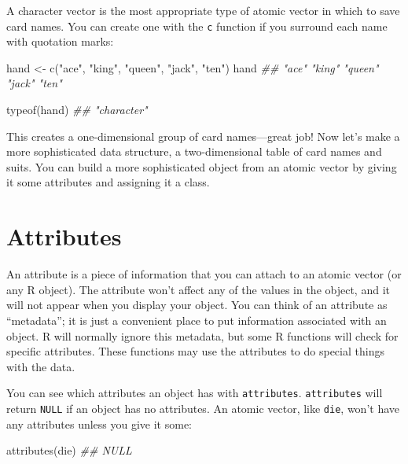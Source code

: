 \documentclass[
  letterpaper,
  DIV=11,
  numbers=noendperiod]{scrbook}
\newenvironment{Shaded}{\begin{snugshade}}{\end{snugshade}}
\newcommand{\DocumentationTok}[1]{\textcolor[rgb]{0.37,0.37,0.37}{\textit{#1}}}
\newcommand{\FunctionTok}[1]{\textcolor[rgb]{0.28,0.35,0.67}{#1}}
\newcommand{\NormalTok}[1]{\textcolor[rgb]{0.00,0.23,0.31}{#1}}
\newcommand{\OtherTok}[1]{\textcolor[rgb]{0.00,0.23,0.31}{#1}}
\newcommand{\StringTok}[1]{\textcolor[rgb]{0.13,0.47,0.30}{#1}}
\begin{document}
A character vector is the most appropriate type of atomic vector in
which to save card names. You can create one with the \texttt{c}
function if you surround each name with quotation marks:

\begin{Shaded}
\begin{Highlighting}[]
\NormalTok{hand }\OtherTok{\textless{}{-}} \FunctionTok{c}\NormalTok{(}\StringTok{"ace"}\NormalTok{, }\StringTok{"king"}\NormalTok{, }\StringTok{"queen"}\NormalTok{, }\StringTok{"jack"}\NormalTok{, }\StringTok{"ten"}\NormalTok{)}
\NormalTok{hand}
\DocumentationTok{\#\# "ace"   "king"  "queen" "jack"  "ten"  }

\FunctionTok{typeof}\NormalTok{(hand)}
\DocumentationTok{\#\# "character"}
\end{Highlighting}
\end{Shaded}

This creates a one-dimensional group of card names---great job! Now
let's make a more sophisticated data structure, a two-dimensional table
of card names and suits. You can build a more sophisticated object from
an atomic vector by giving it some attributes and assigning it a class.

\section{Attributes}\label{sec-attributes}

An attribute is a piece of information that you can attach to an atomic
vector (or any R object). The attribute won't affect any of the values
in the object, and it will not appear when you display your object. You
can think of an attribute as ``metadata''; it is just a convenient place
to put information associated with an object. R will normally ignore
this metadata, but some R functions will check for specific attributes.
These functions may use the attributes to do special things with the
data.

You can see which attributes an object has with \texttt{attributes}.
\texttt{attributes} will return \texttt{NULL} if an object has no
attributes. An atomic vector, like \texttt{die}, won't have any
attributes unless you give it some:

\begin{Shaded}
\begin{Highlighting}[]
\FunctionTok{attributes}\NormalTok{(die)}
\DocumentationTok{\#\# NULL}
\end{Highlighting}
\end{Shaded}
\end{document}
